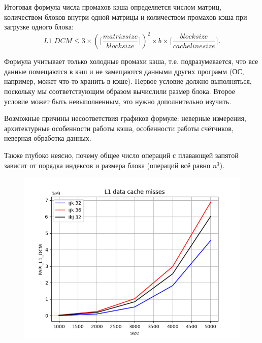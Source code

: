 \documentclass[14pt]{extarticle}
\begin{document}
Итоговая формула числа промахов кэша определяется числом матриц, количеством блоков внутри одной матрицы и количеством промахов кэша при загрузке одного блока:
\begin{equation*}
L1\_DCM \le 3 \times \left( \big \lceil \frac{matrix size}{block size} \big \rceil \right)^2 \times b \times \lceil \frac{block size}{cache line size} \rceil .
\end{equation*}

Формула учитывает только холодные промахи кэша, т.е. подразумевается, что все данные помещаются в кэш и не замещаются данными других программ (ОС, например, может что-то хранить в кэше). Первое условие должно выполняться, поскольку мы соответствующим образом вычислили размер блока. Второе условие может быть невыполненным, это нужно дополнительно изучить.

Возможные причины несоответствия графиков формуле: неверные измерения, архитектурные особенности работы кэша, особенности работы счётчиков, неверная обработка данных.

Также глубоко неясно, почему общее число операций с плавающей запятой зависит от порядка индексов и размера блока (операций всё равно $n^3$).

\begin{figure}[H]
	\centering
	\includegraphics[scale=1]{Figure_1}
\end{figure}
\end{document}
